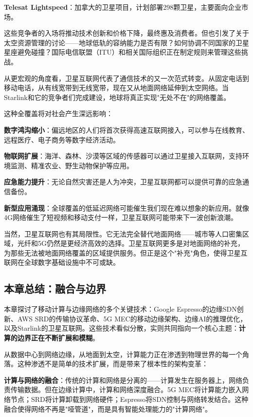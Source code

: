 \textbf{Telesat Lightspeed}：加拿大的卫星项目，计划部署298颗卫星，主要面向企业市场。

这些竞争者的入场将推动技术创新和价格下降，最终惠及消费者。但也引发了关于太空资源管理的讨论——地球低轨的容纳能力是否有限？如何协调不同国家的卫星星座避免碰撞？国际电信联盟（ITU）和相关国际组织正在制定规则来管理这些挑战。

从更宏观的角度看，卫星互联网代表了通信技术的又一次范式转变。从固定电话到移动电话，从有线宽带到无线宽带，现在又从地面网络延伸到太空网络。当Starlink和它的竞争者们完成建设，地球将真正实现"无处不在"的网络覆盖。

这种全覆盖将对社会产生深远影响：

\textbf{数字鸿沟缩小}：偏远地区的人们将首次获得高速互联网接入，可以参与在线教育、远程医疗、电子商务等数字经济活动。

\textbf{物联网扩展}：海洋、森林、沙漠等区域的传感器可以通过卫星接入互联网，支持环境监测、精准农业、野生动物保护等应用。

\textbf{应急能力提升}：无论自然灾害还是人为冲突，卫星互联网都可以提供可靠的应急通信备份。

\textbf{新型应用涌现}：全球覆盖的低延迟网络可能催生我们现在难以想象的新应用。就像4G网络催生了短视频和移动支付一样，卫星互联网可能带来下一波创新浪潮。

当然，卫星互联网也有其局限性。它无法完全替代地面网络——城市等人口密集区域，光纤和5G仍然是更经济高效的选择。卫星互联网更多是对地面网络的补充，为那些无法被地面网络覆盖的区域提供服务。但正是这个"补充"角色，使得卫星互联网在全球数字基础设施中不可或缺。

\subsection{本章总结：融合与边界}

本章探讨了移动计算与边缘网络的多个关键技术：Google Espresso的边缘SDN创新、AWS SRD的传输协议革命、5G MEC的移动边缘架构、边缘AI的推理优化，以及Starlink的卫星互联网。这些技术看似分散，实则共同指向一个核心主题：\textbf{计算的边界正在不断扩展和模糊}。

从数据中心到网络边缘，从地面到太空，计算能力正在渗透到物理世界的每一个角落。这种渗透不是简单的技术扩展，而是带来了根本性的架构变革：

\textbf{计算与网络的融合}：传统的计算和网络是分离的——计算发生在服务器上，网络负责传输数据。但在边缘计算中，计算和网络深度融合。5G MEC将计算能力嵌入网络节点；SRD将计算卸载到网络硬件；Espresso将SDN控制与网络转发结合。这种融合使得网络不再是"哑管道"，而是具有智能处理能力的"计算网络"。


